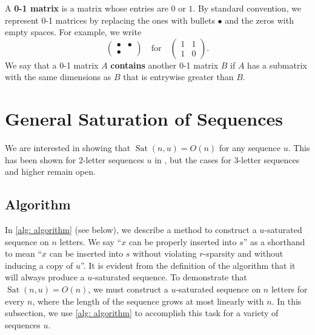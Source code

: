 \documentclass[12pt]{amsart}
\DeclareMathOperator{\Sat}{Sat}
\theoremstyle{definition}
\numberwithin{equation}{section}
\numberwithin{table}{thm}
\begin{document}
A \textbf{0-1 matrix} is a matrix whose entries are $0$ or $1$. By standard convention, we represent 0-1 matrices by replacing the ones with bullets $\bullet$ and the zeros with empty spaces. For example, we write
\[\begin{pmatrix}
    \bullet & \bullet\\
    \bullet & 
\end{pmatrix}\quad \text{for}\quad \begin{pmatrix}
    1 & 1 \\
    1 & 0
\end{pmatrix}.\]
We say that a 0-1 matrix $A$ \textbf{contains} another 0-1 matrix $B$ if $A$ has a submatrix with the same dimensions as $B$ that is entrywise greater than $B$. 
















\section{General Saturation of Sequences}\label{sec: saturation}
We are interested in showing that $ \Sat(n,u) = O(n) $ for any sequence $ u $. This has been shown for $ 2 $-letter sequences $ u $ in \cite{ANAND2025382}, but the cases for $ 3 $-letter sequences and higher remain open.



\subsection{Algorithm}
In \cref{alg: algorithm} (see below), we describe a method to construct a $u$-saturated sequence on $n$ letters. We say ``$x$ can be properly inserted into $s$'' as a shorthand to mean ``$x$ can be inserted into $s$ without violating $r$-sparsity and without inducing a copy of $u$''. It is evident from the definition of the algorithm that it will always produce a $u$-saturated sequence. To demonstrate that $ \Sat(n,u) = O(n) $, we must construct a $ u $-saturated sequence on $ n $ letters for every $ n $, where the length of the sequence grows at most linearly with $ n $. In this subsection, we use \cref{alg: algorithm} to accomplish this task for a variety of sequences $u$.
\end{document}
